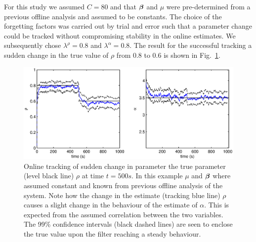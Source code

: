 \documentclass{article}
\begin{document}
 For this study we assumed $C=80$ and that ${\bm \beta}$ and $\mu$ were pre-determined from a previous offline analysis and assumed to be constants.  The choice of the forgetting factors was carried out by trial and error such that a parameter change could be tracked without compromising stability in the online estimates. We subsequently chose $\lambda^\rho = 0.8$ and $\lambda^\alpha = 0.8$. The result for the successful tracking a sudden change in the true value of $\rho$ from 0.8 to 0.6 is shown in Fig.~\ref{fig:oltrack}.

 \begin{figure}[ht]
 \begin{center}
   \includegraphics[width = 6in]{./Figures/onlinetrack.eps}
 \end{center}
 \caption{Online tracking of sudden change in parameter the true parameter (level black line) $\rho$ at time $t = 500s$. In this example $\mu$ and ${\bm \beta}$ where assumed constant and known from previous offline analysis of the system. Note how the change in the estimate (tracking blue line) $\rho$ causes a slight change in the behaviour of the estimate of $\alpha$. This is expected from the assumed correlation between the two variables. The 99\% confidence intervals (black dashed lines) are seen to enclose the true value upon the filter reaching a steady behaviour.} \label{fig:oltrack}
 \end{figure}



\vfill
\end{document}
